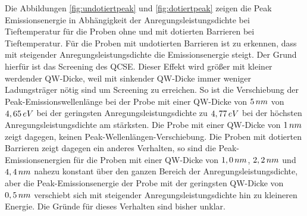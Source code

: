 \noindent 
% 
Die Abbildungen \ref{fig:undotiertpeak} und \ref{fig:dotiertpeak} zeigen die Peak Emissionsenergie in Abhängigkeit der Anregungsleistungsdichte bei Tieftemperatur für die Proben ohne und mit dotierten Barrieren bei Tieftemperatur. Für die Proben mit undotierten Barrieren ist zu erkennen, dass mit steigender Anregungsleistungsdichte die Emissionsenergie steigt. Der Grund hierfür ist das Screening des QCSE. Dieser Effekt wird größer mit kleiner werdender QW-Dicke, weil mit sinkender QW-Dicke immer weniger Ladungsträger nötig sind um Screening zu erreichen. So ist die Verschiebung der Peak-Emissionswellenlänge bei der Probe mit einer QW-Dicke von $5 \thinspace nm$ von $4,65 \thinspace eV$ bei der geringsten Anregungsleistungsdichte zu $4,77 \thinspace eV$ bei der höchsten Anregungsleistungsdichte am stärksten. Die Probe mit einer QW-Dicke von $1 \thinspace nm$ zeigt dagegen, keinen Peak-Wellenlängen-Verschiebung. 
Die Proben mit dotierten Barrieren zeigt dagegen ein anderes Verhalten, so sind die Peak-Emissionsenergien für die Proben mit einer QW-Dicke von 
$1,0 \thinspace nm$, $2,2 \thinspace nm$ und $4,4 \thinspace nm$ nahezu konstant über den ganzen Bereich der Anregungsleistungsdichte, aber die Peak-Emissionsenergie der Probe mit der geringsten QW-Dicke von $0,5 \thinspace nm$ verschiebt sich mit steigender Anregungsleistungsdichte hin zu kleineren Energie. Die Gründe für dieses Verhalten sind bisher unklar.

